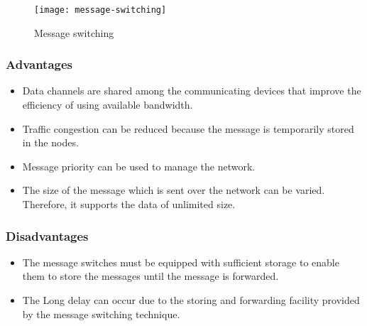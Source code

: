 %
%
\begin{figure}[pht]
	\begin{center}
		\texttt{[image: message-switching]}
		\caption{Message switching}
		\label{fig:message-switching}
	\end{center}
\end{figure}



\begin{multicols}{2}
	\subsubsection*{Advantages}
	\begin{itemize}
		\item Data channels are shared among the communicating devices that improve the efficiency of using available bandwidth.
		\item Traffic congestion can be reduced because the message is temporarily stored in the nodes.
		\item Message priority can be used to manage the network.
		\item The size of the message which is sent over the network can be varied. Therefore, it supports the data of unlimited size.
	\end{itemize}
\end{multicols}


\subsubsection*{Disadvantages}
\begin{multicols}{2}
	\begin{itemize}
		\item The message switches must be equipped with sufficient storage to enable them to store the messages until the message is forwarded.
		\item The Long delay can occur due to the storing and forwarding facility provided by the message switching technique.
	\end{itemize}
\end{multicols}



